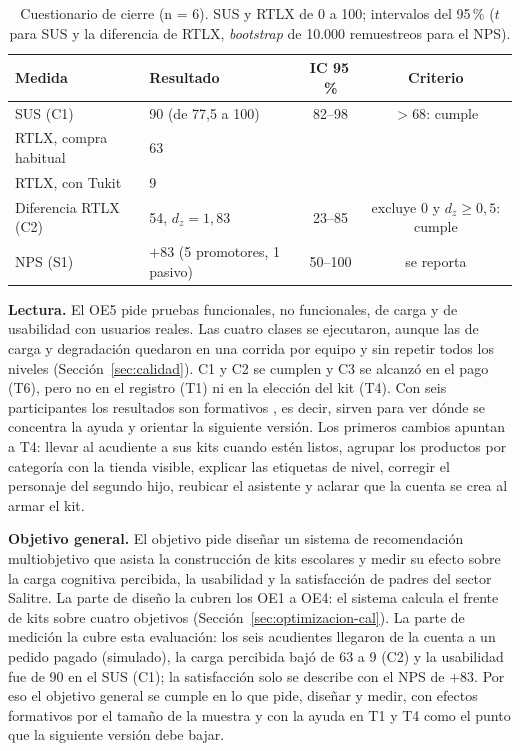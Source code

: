\begin{table}[htbp]
\centering
\small
\caption{Cuestionario de cierre (n = 6). SUS y RTLX de 0 a 100; intervalos del 95\,\%
($t$ para SUS y la diferencia de RTLX, \emph{bootstrap} de 10.000 remuestreos para el NPS).}
\label{tab:oe5-cuestionario}
\begin{tabular}{@{}llcc@{}}
\toprule
Medida & Resultado & IC 95\,\% & Criterio \\
\midrule
SUS (C1) & 90 (de 77,5 a 100) & 82--98 & $> 68$: cumple \\
RTLX, compra habitual & 63 & & \\
RTLX, con Tukit & 9 & & \\
Diferencia RTLX (C2) & 54, $d_z = 1{,}83$ & 23--85 & excluye 0 y $d_z \ge 0{,}5$: cumple \\
NPS (S1) & $+83$ (5 promotores, 1 pasivo) & 50--100 & se reporta \\
\bottomrule
\end{tabular}
\end{table}

\textbf{Lectura.} El OE5 pide pruebas funcionales, no funcionales, de carga y de usabilidad con usuarios
reales. Las cuatro clases se ejecutaron, aunque las de carga y degradación quedaron en una corrida por equipo
y sin repetir todos los niveles (Sección~\ref{sec:calidad}). C1 y C2 se cumplen y C3 se alcanzó en el pago (T6),
pero no en el registro (T1) ni en la elección del kit (T4). Con seis participantes los resultados son
formativos \citep{nielsen_estimating_1994}, es decir, sirven para ver dónde se concentra la ayuda y orientar
la siguiente versión. Los primeros cambios apuntan a T4: llevar al acudiente a sus kits cuando estén listos, agrupar los productos por categoría con la tienda
visible, explicar las etiquetas de nivel, corregir el personaje del segundo hijo, reubicar el asistente y
aclarar que la cuenta se crea al armar el kit.

\textbf{Objetivo general.} El objetivo pide diseñar un sistema de recomendación multiobjetivo que asista la
construcción de kits escolares y medir su efecto sobre la carga cognitiva percibida, la usabilidad y la
satisfacción de padres del sector Salitre. La parte de diseño la cubren los OE1 a OE4: el
sistema calcula el frente de kits sobre cuatro objetivos (Sección~\ref{sec:optimizacion-cal}). La parte de
medición la cubre esta evaluación: los seis acudientes llegaron de la cuenta a un pedido pagado (simulado), la
carga percibida bajó de 63 a 9 (C2) y la usabilidad fue de 90 en el SUS (C1); la satisfacción solo se
describe con el NPS de $+83$. Por eso el objetivo general se cumple en lo que pide, diseñar y medir, con
efectos formativos por el tamaño de la muestra y con la ayuda en T1 y T4 como el punto que la siguiente
versión debe bajar.

